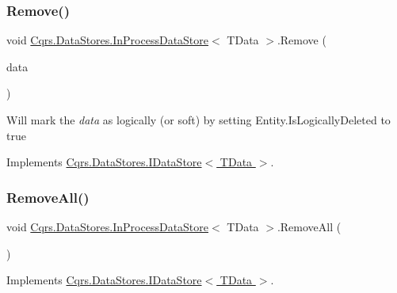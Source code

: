 \subsubsection{\texorpdfstring{Remove()}{Remove()}}
{\footnotesize\ttfamily void \hyperlink{classCqrs_1_1DataStores_1_1InProcessDataStore}{Cqrs.\+Data\+Stores.\+In\+Process\+Data\+Store}$<$ T\+Data $>$.Remove (\begin{DoxyParamCaption}\item[{T\+Data}]{data }\end{DoxyParamCaption})}



Will mark the {\itshape data}  as logically (or soft) by setting Entity.\+Is\+Logically\+Deleted to true 



Implements \hyperlink{interfaceCqrs_1_1DataStores_1_1IDataStore_a7ef540796bbe4257296841590bc23478}{Cqrs.\+Data\+Stores.\+I\+Data\+Store$<$ T\+Data $>$}.

\mbox{\label{classCqrs_1_1DataStores_1_1InProcessDataStore_acd350f7abef7311064434ae31a50755b}} 
\subsubsection{\texorpdfstring{Remove\+All()}{RemoveAll()}}
{\footnotesize\ttfamily void \hyperlink{classCqrs_1_1DataStores_1_1InProcessDataStore}{Cqrs.\+Data\+Stores.\+In\+Process\+Data\+Store}$<$ T\+Data $>$.Remove\+All (\begin{DoxyParamCaption}{ }\end{DoxyParamCaption})}



Implements \hyperlink{interfaceCqrs_1_1DataStores_1_1IDataStore_aead8d7a39a717d29af05daf7b64bea94}{Cqrs.\+Data\+Stores.\+I\+Data\+Store$<$ T\+Data $>$}.

\mbox{\label{classCqrs_1_1DataStores_1_1InProcessDataStore_af70e6f6e5aabc24ee12ef3d2bcd3bf60}} 
